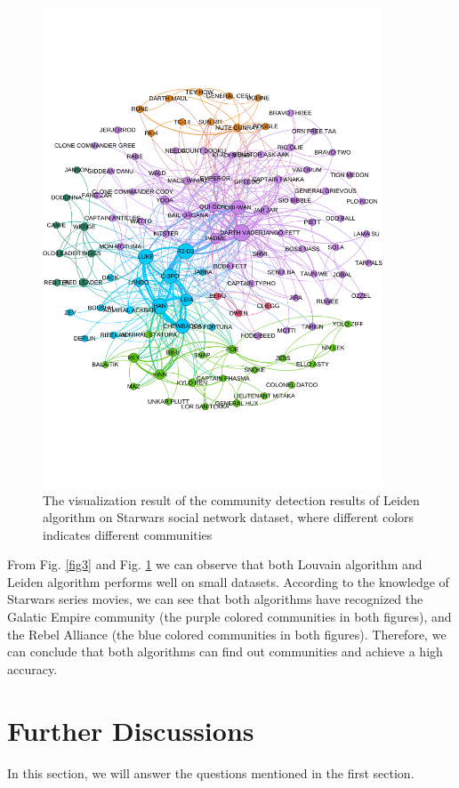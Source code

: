 \documentclass[12pt, a4paper]{article}
\theoremstyle{definition}
\begin{document}
\begin{figure}[htbp]
	\centering
	\includegraphics[width=0.9\textwidth]{4.pdf}
	\caption{The visualization result of the community detection results of Leiden algorithm on Starwars social network dataset, where different colors indicates different communities}
	\label{fig4}
\end{figure}

From Fig. \ref{fig3} and Fig. \ref{fig4} we can observe that both Louvain algorithm and Leiden algorithm performs well on small datasets. According to the knowledge of Starwars series movies, we can see that both algorithms have recognized the Galatic Empire community (the purple colored communities in both figures), and the Rebel Alliance (the blue colored communities in both figures). Therefore, we can conclude that both algorithms can find out communities and achieve a high accuracy.

\section{Further Discussions}
In this section, we will answer the questions mentioned in the first section.
\end{document}
